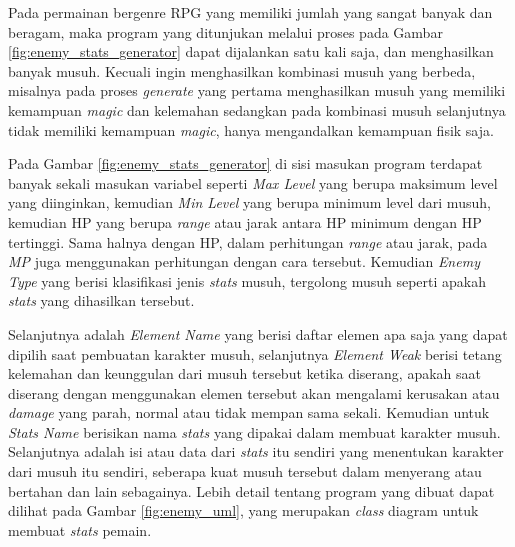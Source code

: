 Pada permainan bergenre RPG yang memiliki jumlah yang sangat banyak dan beragam, maka program yang ditunjukan melalui proses pada Gambar \ref{fig:enemy_stats_generator} dapat dijalankan satu kali saja, dan menghasilkan banyak musuh. Kecuali ingin menghasilkan kombinasi musuh yang berbeda, misalnya pada proses \textit{generate} yang pertama menghasilkan musuh yang memiliki kemampuan \textit{magic} dan kelemahan sedangkan pada kombinasi musuh selanjutnya tidak memiliki kemampuan \textit{magic}, hanya mengandalkan kemampuan fisik saja.
\vspace{1ex}

Pada Gambar \ref{fig:enemy_stats_generator} di sisi masukan program terdapat banyak sekali masukan variabel seperti \textit{Max Level} yang berupa maksimum level yang diinginkan, kemudian \textit{Min Level} yang berupa minimum level dari musuh, kemudian HP yang berupa \textit{range} atau jarak antara HP minimum dengan HP tertinggi. Sama halnya dengan HP, dalam perhitungan \textit{range} atau jarak, pada \textit{MP} juga menggunakan perhitungan dengan cara tersebut. Kemudian \textit{Enemy Type} yang berisi klasifikasi jenis \textit{stats} musuh, tergolong musuh seperti apakah \textit{stats} yang dihasilkan tersebut. 
\vspace{1ex}

Selanjutnya adalah \textit{Element Name} yang berisi daftar elemen apa saja yang dapat dipilih saat pembuatan karakter musuh, selanjutnya \textit{Element Weak} berisi tetang kelemahan dan keunggulan dari musuh tersebut ketika diserang, apakah saat diserang dengan menggunakan elemen tersebut akan mengalami kerusakan atau \textit{damage} yang parah, normal atau tidak mempan sama sekali. Kemudian untuk \textit{Stats Name} berisikan nama \textit{stats} yang dipakai dalam membuat karakter musuh. Selanjutnya adalah isi atau data dari \textit{stats} itu sendiri yang menentukan karakter dari musuh itu sendiri, seberapa kuat musuh tersebut dalam menyerang atau bertahan dan lain sebagainya. Lebih detail tentang program yang dibuat dapat dilihat pada Gambar \ref{fig:enemy_uml}, yang merupakan \textit{class} diagram untuk membuat \textit{stats} pemain.
\vspace{1ex}

